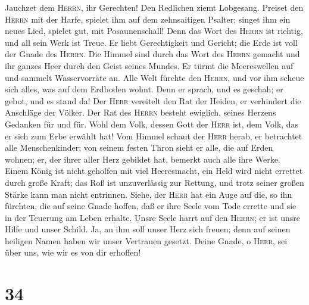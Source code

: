  Jauchzet dem \textsc{Herrn}, ihr Gerechten! Den Redlichen
ziemt Lobgesang.  Preiset den \textsc{Herrn} mit der
Harfe, spielet ihm auf dem zehnsaitigen Psalter;  singet
ihm ein neues Lied, spielet gut, mit Posaunenschall!  Denn
das Wort des \textsc{Herrn} ist richtig, und all sein Werk ist Treue.
 Er liebt Gerechtigkeit und Gericht; die Erde ist voll der
Gnade des \textsc{Herrn}.  Die Himmel sind durch das Wort
des \textsc{Herrn} gemacht und ihr ganzes Heer durch den Geist seines
Mundes.  Er türmt die Meereswellen auf und sammelt
Wasservorräte an.  Alle Welt fürchte den \textsc{Herrn},
und vor ihm scheue sich alles, was auf dem Erdboden wohnt.
 Denn er sprach, und es geschah; er gebot, und es stand
da!  Der \textsc{Herr} vereitelt den Rat der Heiden, er
verhindert die Anschläge der Völker.  Der Rat des
\textsc{Herrn} besteht ewiglich, seines Herzens Gedanken für und für.
 Wohl dem Volk, dessen Gott der \textsc{Herr} ist, dem
Volk, das er sich zum Erbe erwählt hat!  Vom Himmel
schaut der \textsc{Herr} herab, er betrachtet alle Menschenkinder;
 von seinem festen Thron sieht er alle, die auf Erden
wohnen;  er, der ihrer aller Herz gebildet hat, bemerkt
auch alle ihre Werke.  Einem König ist nicht geholfen mit
viel Heeresmacht, ein Held wird nicht errettet durch große Kraft;
 das Roß ist unzuverlässig zur Rettung, und trotz seiner
großen Stärke kann man nicht entrinnen.  Siehe, der
\textsc{Herr} hat ein Auge auf die, so ihn fürchten, die auf seine Gnade
hoffen,  daß er ihre Seele vom Tode errette und sie in
der Teuerung am Leben erhalte.  Unsre Seele harrt auf den
\textsc{Herrn}; er ist unsre Hilfe und unser Schild.  Ja,
an ihm soll unser Herz sich freuen; denn auf seinen heiligen Namen haben
wir unser Vertrauen gesetzt.  Deine Gnade, o
\textsc{Herr}, sei über uns, wie wir es von dir erhoffen!

\hypertarget{section-33}{%
\section{34}\label{section-33}}


